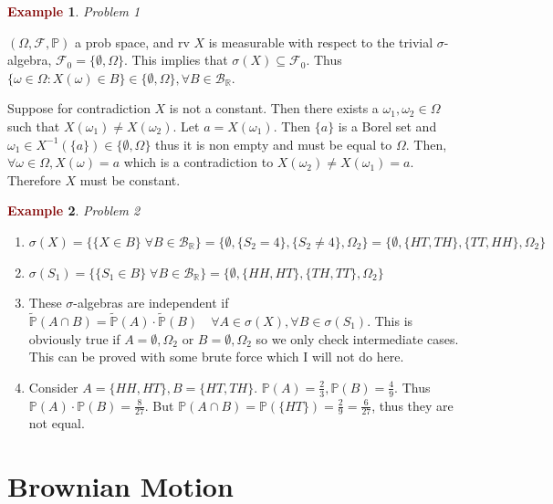 \documentclass[11pt]{article}
\theoremstyle{definition}
\theoremstyle{definition}
\newcommand{\R}[0]{\mathbb{R}}
\theoremstyle{definition}
\newtheorem{ex}{\textcolor{Maroon}{Example}}
\theoremstyle{remark}
\begin{document}
\begin{ex}\textit{Problem 1}

    $(\Omega, \mathcal{F}, \mathbb{P})$ a prob space, and rv $X$ is measurable with respect to the trivial $\sigma$-algebra,
    $\mathcal{F}_0 = \{\emptyset, \Omega\}$. This implies that $\sigma(X) \subseteq \mathcal{F}_0$. Thus 
    $\{\omega \in \Omega : X(\omega) \in B \} \in \{\emptyset, \Omega\}, \forall B \in \mathcal{B}_{\R}$.

    Suppose for contradiction $X$ is not a constant. Then there exists a $\omega_1, \omega_2 \in \Omega$ such that
    $X(\omega_1) \neq X(\omega_2)$. Let $a = X(\omega_1)$. Then $\{a\}$ is a Borel set and $\omega_1 \in X^{-1}(\{a\}) \in \{\emptyset, \Omega\}$
    thus it is non empty and must be equal to $\Omega$. Then, $\forall \omega \in \Omega, X(\omega) = a$ which is a contradiction to 
    $X(\omega_2) \neq X(\omega_1) = a$. Therefore $X$ must be constant. 
\end{ex}

\begin{ex} \textit{Problem 2}
    \begin{enumerate}
        \item $\sigma(X) = \{\{ X \in B \} \; \forall B \in \mathcal{B}_{\R}\} = \{ \emptyset, \{S_2 = 4\}, \{S_2 \neq 4\}, \Omega_2\} = \{  \emptyset, \{HT, TH\}, \{TT, HH\}, \Omega_2\}$ 
        \item $\sigma(S_1) = \{\{ S_1 \in B \} \; \forall B \in \mathcal{B}_{\R}\} = \{\emptyset, \{HH, HT\}, \{TH, TT\}, \Omega_2\}$
        \item These $\sigma$-algebras are independent if $\tilde{\mathbb{P}}(A \cap B) = \tilde{\mathbb{P}}(A) \cdot \tilde{\mathbb{P}}(B) \quad \forall A \in \sigma(X), \forall B \in \sigma(S_1)$.
        This is obviously true if $A = \emptyset, \Omega_2$ or $B = \emptyset, \Omega_2$ so we only check intermediate cases. This can be proved with some brute force
        which I will not do here.
        \item Consider $A = \{HH, HT\}, B = \{HT, TH\}$. $\mathbb{P}(A) = \frac{2}{3}, \mathbb{P}(B) = \frac{4}{9}$. Thus $\mathbb{P}(A) \cdot \mathbb{P}(B) = \frac{8}{27}$.
        But $\mathbb{P}(A \cap B) = \mathbb{P}(\{HT\}) = \frac{2}{9} = \frac{6}{27}$, thus they are not equal.     
    \end{enumerate}

    
\end{ex}

\section{Brownian Motion}
\end{document}
